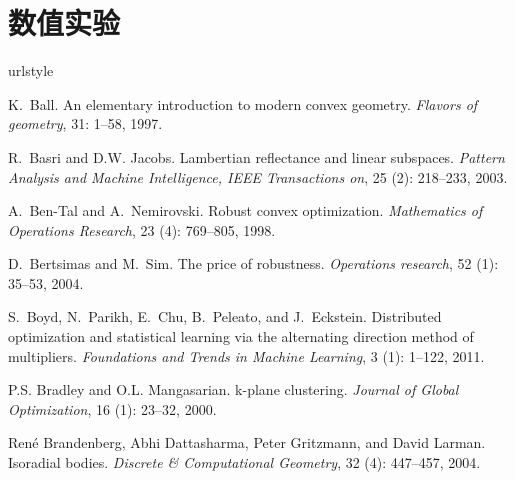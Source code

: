 \documentclass{ctexart}
\begin{document}
\section{数值实验}\label{sec:experiments}
\begin{thebibliography}{47}
    \providecommand{\natexlab}[1]{#1}
    \providecommand{\url}[1]{\texttt{#1}}
    \expandafter\ifx\csname urlstyle\endcsname\relax
    \providecommand{\doi}[1]{doi: #1}\else
    \providecommand{\doi}{doi: \begingroup \urlstyle{rm}\Url}\fi

    K.~Ball.
    \newblock An elementary introduction to modern convex geometry.
    \newblock \emph{Flavors of geometry}, 31: 1--58, 1997.

    R.~Basri and D.W. Jacobs.
    \newblock Lambertian reflectance and linear subspaces.
    \newblock \emph{Pattern Analysis and Machine Intelligence, IEEE Transactions
    on}, 25 (2): 218--233, 2003.

    A.~Ben-Tal and A.~Nemirovski.
    \newblock Robust convex optimization.
    \newblock \emph{Mathematics of Operations Research}, 23 (4):
    769--805, 1998.

    D.~Bertsimas and M.~Sim.
    \newblock The price of robustness.
    \newblock \emph{Operations research}, 52 (1): 35--53, 2004.

    S.~Boyd, N.~Parikh, E.~Chu, B.~Peleato, and J.~Eckstein.
    \newblock Distributed optimization and statistical learning via the alternating
    direction method of multipliers.
    \newblock \emph{Foundations and Trends{\textregistered} in Machine Learning},
    3 (1): 1--122, 2011.

    P.S. Bradley and O.L. Mangasarian.
    \newblock k-plane clustering.
    \newblock \emph{Journal of Global Optimization}, 16 (1):
    23--32, 2000.

    Ren{\'e} Brandenberg, Abhi Dattasharma, Peter Gritzmann, and David Larman.
    \newblock Isoradial bodies.
    \newblock \emph{Discrete \& Computational Geometry}, 32 (4):
    447--457, 2004.


\end{thebibliography}
\end{document}
